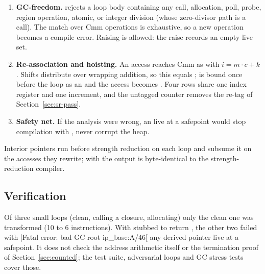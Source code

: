 \begin{enumerate}
  \item \textbf{GC-freedom.}  rejects a loop body containing
        any call, allocation, poll, probe, region operation, atomic, or integer
        division (whose zero-divisor path is a call). The match over Cmm
        operations is exhaustive, so a new operation becomes a compile error.
        Raising is allowed: the raise records an empty live set.
  \item \textbf{Re-association and hoisting.} An access 
        reaches Cmm as  with
        $i = m\cdot c + k$. Shifts distribute over wrapping addition, so this
        equals ;  is
        bound once before the loop as an  and the access becomes
        . Four rows share one index register and
        one increment, and the untagged counter removes the re-tag of
        Section~\ref{sec:sr-pass}.
  \item \textbf{Safety net.} If the analysis were wrong, an  live at
        a safepoint would stop compilation with , never
        corrupt the heap.
\end{enumerate}

Interior pointers run before strength reduction on each loop and subsume it on
the accesses they rewrite; with  the output is
byte-identical to the strength-reduction compiler.

\subsection{Verification}
Of three small loops (clean, calling a closure, allocating) only the clean
one was transformed (10 to 6 instructions). With  stubbed to
return , the other two failed with
\ainl|Fatal error: bad GC root ip_base:A/46[%
any derived pointer live at a safepoint. It does not check the address
arithmetic itself or the termination proof of Section~\ref{sec:counted}; the
test suite, adversarial loops and GC stress tests cover those.

